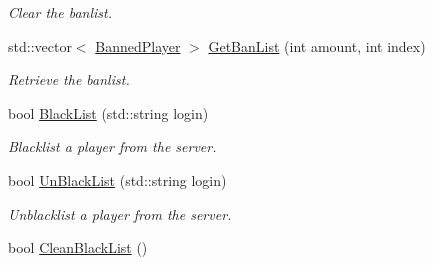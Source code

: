 \begin{DoxyCompactItemize}
\begin{DoxyCompactList}\small\item\em Clear the banlist. \end{DoxyCompactList}\item 
std\-::vector$<$ \hyperlink{structBannedPlayer}{Banned\-Player} $>$ \hyperlink{classMethods_a43634e1c8520fbfdc35afab75e0246b4}{Get\-Ban\-List} (int amount, int index)
\begin{DoxyCompactList}\small\item\em Retrieve the banlist. \end{DoxyCompactList}\item 
bool \hyperlink{classMethods_ab2f841668adfe9c23381abb39924b6d2}{Black\-List} (std\-::string login)
\begin{DoxyCompactList}\small\item\em Blacklist a player from the server. \end{DoxyCompactList}\item 
bool \hyperlink{classMethods_a2bd013b4b9f849c58024dfbd1eaa1177}{Un\-Black\-List} (std\-::string login)
\begin{DoxyCompactList}\small\item\em Unblacklist a player from the server. \end{DoxyCompactList}\item 
\hypertarget{classMethods_a9bbf360ff5b4c296de9687feb3289c7b}{bool \hyperlink{classMethods_a9bbf360ff5b4c296de9687feb3289c7b}{Clean\-Black\-List} ()}\label{classMethods_a9bbf360ff5b4c296de9687feb3289c7b}


\end{DoxyCompactItemize}
